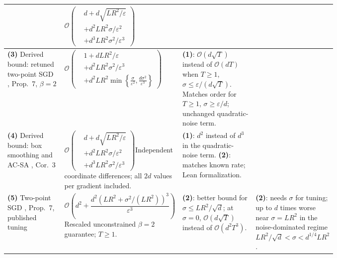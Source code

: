 \begin{table}[tp]
\begin{threeparttable}
\begin{tabularx}{\linewidth}{@{}>{\raggedright\arraybackslash}p{0.20\linewidth}>{\raggedright\arraybackslash}p{0.32\linewidth}>{\raggedright\arraybackslash}p{0.25\linewidth}>{\raggedright\arraybackslash}X@{}}
& $\mathcal{O}\!\left(\begin{aligned}&d+d\sqrt{LR^2/\varepsilon}\\&+d^2LR^2\sigma/\varepsilon^2\\&+d^3LR^2\sigma^2/\varepsilon^3\end{aligned}\right)$ & & \\
\midrule[1.2pt]
\textbf{(3)} Derived bound: retuned two-point SGD \citep{zoscBachPerchet2016}, Prop.~7, $\beta=2$
& $\mathcal{O}\!\left(\begin{aligned}&1+dLR^2/\varepsilon\\&+d^2LR^2\sigma^2/\varepsilon^3\\&+d^2LR^2\min\!\left\{\frac{\sigma}{\varepsilon^2},\frac{d\sigma^2}{\varepsilon^3}\right\}\end{aligned}\right)$
& \textbf{(1)}: $\mathcal{O}(d\sqrt T)$ instead of $\mathcal{O}(dT)$ when $T\ge1$, $\sigma\le\varepsilon/(d\sqrt T)$. Matches order for $T\ge1$, $\sigma\ge\varepsilon/d$; unchanged quadratic-noise term.
& \\
\midrule
\textbf{(4)} Derived bound: box smoothing and AC-SA \citep{zoscLan2008}, Cor.~3
& $\mathcal{O}\!\left(\begin{aligned}&d+d\sqrt{LR^2/\varepsilon}\\&+d^2LR^2\sigma/\varepsilon^2\\&+d^3LR^2\sigma^2/\varepsilon^3\end{aligned}\right)$\newline Independent coordinate differences; all $2d$ values per gradient included.
& \textbf{(1)}: $d^2$ instead of $d^3$ in the quadratic-noise term. \textbf{(2)}: matches known rate; Lean formalization.
& \\
\midrule
\textbf{(5)} Two-point SGD \citep{zoscBachPerchet2016}, Prop.~7, published tuning
& $\mathcal{O}\!\left(d^2+\dfrac{d^2(LR^2+\sigma^2/(LR^2))^3}{\varepsilon^3}\right)$\newline Rescaled unconstrained $\beta=2$ guarantee; $T\ge1$.
& \textbf{(2)}: better bound for $\sigma\le LR^2/\sqrt d$; at $\sigma=0$, $\mathcal{O}(d\sqrt T)$ instead of $\mathcal{O}(d^2T^3)$.
& \textbf{(2)}: needs $\sigma$ for tuning; up to $d$ times worse near $\sigma=LR^2$ in the noise-dominated regime $LR^2/\sqrt d<\sigma<d^{1/4}LR^2$.
\\


\end{tabularx}
\end{threeparttable}
\end{table}

